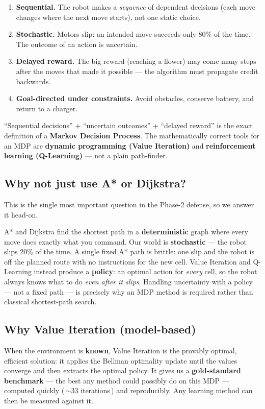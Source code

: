 \documentclass[11pt]{article}
\begin{document}
\begin{enumerate}[leftmargin=1.5em]
  \item \textbf{Sequential.} The robot makes a \emph{sequence} of dependent
        decisions (each move changes where the next move starts), not one static
        choice.
  \item \textbf{Stochastic.} Motors slip: an intended move succeeds only 80\% of
        the time. The outcome of an action is uncertain.
  \item \textbf{Delayed reward.} The big reward (reaching a flower) may come many
        steps after the moves that made it possible --- the algorithm must
        propagate credit backwards.
  \item \textbf{Goal-directed under constraints.} Avoid obstacles, conserve
        battery, and return to a charger.
\end{enumerate}

\begin{claim}
``Sequential decisions'' $+$ ``uncertain outcomes'' $+$ ``delayed reward'' is the
exact definition of a \textbf{Markov Decision Process}. The mathematically
correct tools for an MDP are \textbf{dynamic programming (Value Iteration)} and
\textbf{reinforcement learning (Q-Learning)} --- not a plain path-finder.
\end{claim}

\subsection{Why not just use A* or Dijkstra?}
This is the single most important question in the Phase-2 defense, so we answer
it head-on.

\begin{rebut}
A* and Dijkstra find the shortest path in a \textbf{deterministic} graph where
every move does exactly what you command. Our world is \textbf{stochastic} --- the
robot slips 20\% of the time. A single fixed A* path is brittle: one slip and the
robot is off the planned route with no instructions for the new cell. Value
Iteration and Q-Learning instead produce a \textbf{policy}: an optimal action for
\emph{every} cell, so the robot always knows what to do \emph{even after it
slips}. Handling uncertainty with a policy --- not a fixed path --- is precisely
why an MDP method is required rather than classical shortest-path search.
\end{rebut}

\subsection{Why Value Iteration (model-based)}
\begin{rebut}
When the environment is \textbf{known}, Value Iteration is the provably optimal,
efficient solution: it applies the Bellman optimality update until the values
converge and then extracts the optimal policy. It gives us a \textbf{gold-standard
benchmark} --- the best any method could possibly do on this MDP --- computed
quickly (\,$\sim$33 iterations\,) and reproducibly. Any learning method can then
be measured against it.
\end{rebut}
\end{document}
